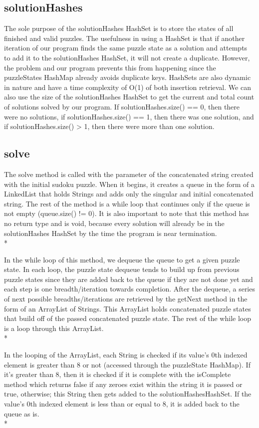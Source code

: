 \documentclass[conference]{IEEEtran}
\begin{document}
\subsection{solutionHashes}
The sole purpose of the solutionHashes HashSet is to store the states of all finished and valid puzzles. The usefulness in using a HashSet is that if another iteration of our program finds the same puzzle state as a solution and attempts to add it to the solutionHashes HashSet, it will not create a duplicate. However, the problem and our program prevents this from happening since the puzzleStates HashMap already avoids duplicate keys. HashSets are also dynamic in nature and have a time complexity of O(1) of both insertion retrieval. We can also use the size of the solutionHashes HashSet to get the current and total count of solutions solved by our program. If solutionHashes.size() == 0, then there were no solutions, if solutionHashes.size() == 1, then there was one solution, and if solutionHashes.size() > 1, then there were more than one solution.
\subsection{solve}
The solve method is called with the parameter of the concatenated string created with the initial sudoku puzzle. When it begins, it creates a queue in the form of a LinkedList that holds Strings and adds only the singular and initial concatenated string. The rest of the method is a while loop that continues only if the queue is not empty (queue.size() != 0). It is also important to note that this method has no return type and is void, because every solution will already be in the solutionHashes HashSet by the time the program is near termination.
\\*

In the while loop of this method, we dequeue the queue to get a given puzzle state. In each loop, the puzzle state dequeue tends to build up from previous puzzle states since they are added back to the queue if they are not done yet and each step is one breadth/iteration towards completion. After the dequeue, a series of next possible breadths/iterations are retrieved by the getNext method in the form of an ArrayList of Strings. This ArrayList holds concatenated puzzle states that build off of the passed concatenated puzzle state. The rest of the while loop is a loop through this ArrayList.
\\*

In the looping of the ArrayList, each String is checked if its value’s 0th indexed element is greater than 8 or not (accessed through the puzzleState HashMap). If it's greater than 8, then it is checked if it is complete with the isComplete method which returns false if any zeroes exist within the string it is passed or true, otherwise; this String then gets added to the solutionHashesHashSet. If the value’s 0th indexed element is less than or equal to 8, it is added back to the queue as is.
\\*
\end{document}

